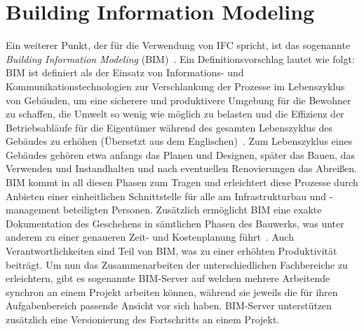 \section{Building Information Modeling}\label{basics:bim}
Ein weiterer Punkt, der für die Verwendung von IFC spricht, ist das sogenannte \textit{Building Information Modeling} (BIM)~\cite{Building41:online}.
Ein Definitionsvorschlag lautet wie folgt: \glqq{}BIM ist definiert als der Einsatz von Informations- und Kommunikationstechnologien zur Verschlankung der Prozesse im Lebenszyklus von Gebäuden, um eine sicherere und produktivere Umgebung für die Bewohner zu schaffen, die Umwelt so wenig wie möglich zu belasten und die Effizienz der Betriebsabläufe für die Eigentümer während des gesamten Lebenszyklus des Gebäudes zu erhöhen\grqq{} (Übersetzt aus dem Englischen)~\cite{Arayici2010}.
Zum Lebenszyklus eines Gebäudes gehören etwa anfangs das Planen und Designen, später das Bauen, das Verwenden und Instandhalten und nach eventuellen Renovierungen das Abreißen.
BIM kommt in all diesen Phasen zum Tragen und erleichtert diese Prozesse durch Anbieten einer einheitlichen Schnittstelle für alle am Infrastrukturbau und -management beteiligten Personen.
Zusätzlich ermöglicht BIM eine exakte Dokumentation des Geschehens in sämtlichen Phasen des Bauwerks, was unter anderem zu einer genaueren Zeit- und Kostenplanung führt~\cite{Ding2014}.
Auch Verantwortlichkeiten sind Teil von BIM, was zu einer erhöhten Produktivität beiträgt.
Um nun das Zusammenarbeiten der unterschiedlichen Fachbereiche zu erleichtern, gibt es sogenannte BIM-Server auf welchen mehrere Arbeitende synchron an einem Projekt arbeiten können, während sie jeweils die für ihren Aufgabenbereich passende Ansicht vor sich haben.
BIM-Server unterstützen zusätzlich eine Versionierung des Fortschritts an einem Projekt.

